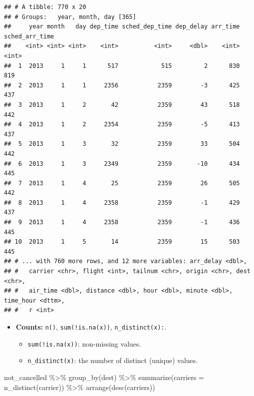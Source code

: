 \documentclass[
]{book}
\newenvironment{Shaded}{\begin{snugshade}}{\end{snugshade}}
\newcommand{\AttributeTok}[1]{\textcolor[rgb]{0.77,0.63,0.00}{#1}}
\newcommand{\FunctionTok}[1]{\textcolor[rgb]{0.00,0.00,0.00}{#1}}
\newcommand{\NormalTok}[1]{#1}
\newcommand{\SpecialCharTok}[1]{\textcolor[rgb]{0.00,0.00,0.00}{#1}}
\providecommand{\tightlist}{%
  \setlength{\itemsep}{0pt}\setlength{\parskip}{0pt}}
\theoremstyle{definition}
\theoremstyle{remark}
\begin{document}
\begin{verbatim}
## # A tibble: 770 x 20
## # Groups:   year, month, day [365]
##     year month   day dep_time sched_dep_time dep_delay arr_time sched_arr_time
##    <int> <int> <int>    <int>          <int>     <dbl>    <int>          <int>
##  1  2013     1     1      517            515         2      830            819
##  2  2013     1     1     2356           2359        -3      425            437
##  3  2013     1     2       42           2359        43      518            442
##  4  2013     1     2     2354           2359        -5      413            437
##  5  2013     1     3       32           2359        33      504            442
##  6  2013     1     3     2349           2359       -10      434            445
##  7  2013     1     4       25           2359        26      505            442
##  8  2013     1     4     2358           2359        -1      429            437
##  9  2013     1     4     2358           2359        -1      436            445
## 10  2013     1     5       14           2359        15      503            445
## # ... with 760 more rows, and 12 more variables: arr_delay <dbl>,
## #   carrier <chr>, flight <int>, tailnum <chr>, origin <chr>, dest <chr>,
## #   air_time <dbl>, distance <dbl>, hour <dbl>, minute <dbl>, time_hour <dttm>,
## #   r <int>
\end{verbatim}

\begin{itemize}
\item
  \textbf{Counts:} \texttt{n()}, \texttt{sum(!is.na(x))}, \texttt{n\_distinct(x):}.

  \begin{itemize}
  \tightlist
  \item
    \texttt{sum(!is.na(x))}: non-missing values.
  \item
    \texttt{n\_distinct(x)}: the number of distinct (unique) values.
  \end{itemize}
\end{itemize}

\begin{Shaded}
\begin{Highlighting}[]
\NormalTok{not\_cancelled }\SpecialCharTok{\%\textgreater{}\%}
  \FunctionTok{group\_by}\NormalTok{(dest) }\SpecialCharTok{\%\textgreater{}\%}
  \FunctionTok{summarize}\NormalTok{(}\AttributeTok{carriers =} \FunctionTok{n\_distinct}\NormalTok{(carrier)) }\SpecialCharTok{\%\textgreater{}\%}
  \FunctionTok{arrange}\NormalTok{(}\FunctionTok{desc}\NormalTok{(carriers))}
\end{Highlighting}
\end{Shaded}
\end{document}
